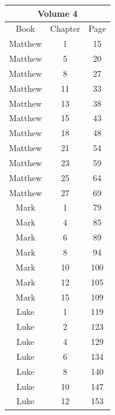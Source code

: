 \documentclass{article}
\newlength{\minipageheight}
\newlength{\minipagewidth}
\begin{document}
\begin{minipage}[r][\minipageheight][t]{\minipagewidth}%
    \begin{center}
        \renewcommand{\arraystretch}{1.0}
        \begin{tabular}{|c|c|c|}
            \hline
            \multicolumn{3}{|c|}{Volume 4} \\
            \hline
            Book    & Chapter & Page       \\
            \hline
            Matthew & 1       & 15         \\
            Matthew & 5       & 20         \\
            Matthew & 8       & 27         \\
            Matthew & 11      & 33         \\
            Matthew & 13      & 38         \\
            Matthew & 15      & 43         \\
            Matthew & 18      & 48         \\
            Matthew & 21      & 54         \\
            Matthew & 23      & 59         \\
            Matthew & 25      & 64         \\
            Matthew & 27      & 69         \\
            Mark    & 1       & 79         \\
            Mark    & 4       & 85         \\
            Mark    & 6       & 89         \\
            Mark    & 8       & 94         \\
            Mark    & 10      & 100        \\
            Mark    & 12      & 105        \\
            Mark    & 15      & 109        \\
            Luke    & 1       & 119        \\
            Luke    & 2       & 123        \\
            Luke    & 4       & 129        \\
            Luke    & 6       & 134        \\
            Luke    & 8       & 140        \\
            Luke    & 10      & 147        \\
            Luke    & 12      & 153        \\

\end{tabular}
\end{center}
\end{minipage}
\end{document}
